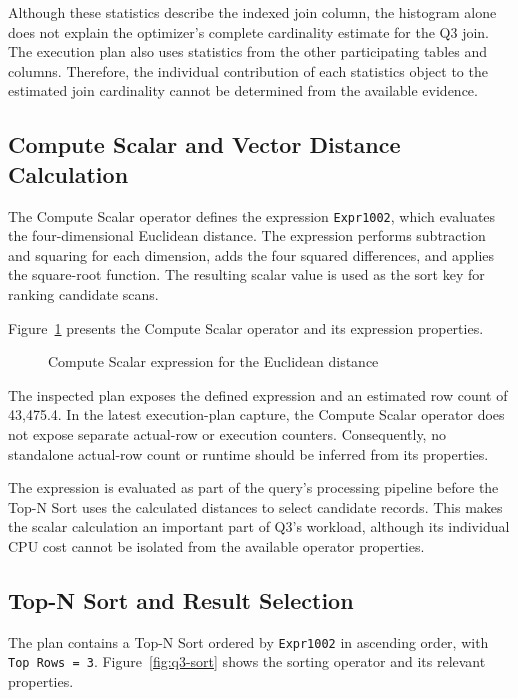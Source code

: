 Although these statistics describe the indexed join column, the histogram alone does not explain the optimizer's complete cardinality estimate for the Q3 join. The execution plan also uses statistics from the other participating tables and columns. Therefore, the individual contribution of each statistics object to the estimated join cardinality cannot be determined from the available evidence.

\subsection{Compute Scalar and Vector Distance Calculation}

The Compute Scalar operator defines the expression \texttt{Expr1002}, which evaluates the four-dimensional Euclidean distance. The expression performs subtraction and squaring for each dimension, adds the four squared differences, and applies the square-root function. The resulting scalar value is used as the sort key for ranking candidate scans.

Figure~\ref{fig:q3-compute-scalar} presents the Compute Scalar operator and its expression properties.

\begin{figure}[htbp]
\centering
{}
\caption{Compute Scalar expression for the Euclidean distance}
\label{fig:q3-compute-scalar}
\end{figure}

The inspected plan exposes the defined expression and an estimated row count of 43,475.4. In the latest execution-plan capture, the Compute Scalar operator does not expose separate actual-row or execution counters. Consequently, no standalone actual-row count or runtime should be inferred from its properties.

The expression is evaluated as part of the query's processing pipeline before the Top-N Sort uses the calculated distances to select candidate records. This makes the scalar calculation an important part of Q3's workload, although its individual CPU cost cannot be isolated from the available operator properties.

\subsection{Top-N Sort and Result Selection}

The plan contains a Top-N Sort ordered by \texttt{Expr1002} in ascending order, with \texttt{Top Rows = 3}. Figure~\ref{fig:q3-sort} shows the sorting operator and its relevant properties.

